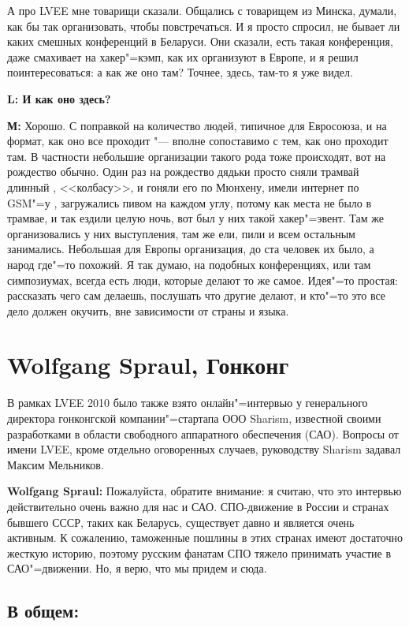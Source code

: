 \documentclass[10pt, a5paper]{article}
\begin{document}
А про LVEE мне товарищи сказали. Общались с товарищем из Минска, думали, как бы так организовать, чтобы повстречаться. И я просто спросил, не бывает ли каких смешных конференций в Беларуси. Они сказали, есть такая конференция, даже смахивает на хакер"=кэмп, как их организуют в Европе, и я решил поинтересоваться: а как же оно там? Точнее, здесь, там-то я уже видел. 

{\noindent \bf L: И как оно здесь?}

{\noindent \bf М:} Хорошо. С поправкой на количество людей, типичное для Евросоюза, и на формат, как оно все проходит "--- вполне сопоставимо с тем, как оно проходит там. В частности небольшие организации такого рода тоже происходят, вот на рождество обычно. Один раз на рождество дядьки просто сняли трамвай длинный , <<колбасу>>, и гоняли его по Мюнхену, имели интернет по GSM"=у , загружались пивом на каждом углу, потому как места не было в трамвае, и так ездили целую ночь, вот был у них такой хакер"=эвент. Там же организовались у них выступления, там же ели, пили и всем остальным занимались. Небольшая для Европы организация, до ста человек их было, а народ где"=то похожий. Я так думаю, на подобных конференциях, или там симпозиумах, всегда есть люди, которые делают то же самое. Идея"=то простая: рассказать чего сам делаешь, послушать что другие делают, и кто"=то это все дело должен окучить, вне зависимости от страны и языка.

\section{Wolfgang Spraul, Гонконг}

В рамках LVEE 2010 было также взято онлайн"=интервью у генерального директора гонконгской компании"=стартапа ООО Sharism, известной своими разработками в области свободного аппаратного обеспечения (САО). Вопросы от имени LVEE, кроме отдельно оговоренных случаев, руководству Sharism задавал Максим Мельников.

{\noindent \bf Wolfgang Spraul:} Пожалуйста, обратите внимание: я считаю, что это интервью действительно очень важно для нас и САО. СПО-движение в России и странах бывшего СССР, таких как Беларусь, существует давно и является очень активным. К сожалению, таможенные пошлины в этих странах имеют достаточно жесткую историю, поэтому русским фанатам СПО тяжело принимать участие в САО"=движении. Но, я верю, что мы придем и сюда.

\subsection*{В общем:}
\end{document}
